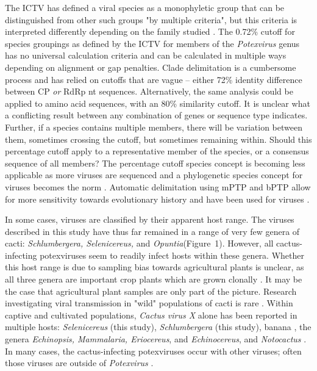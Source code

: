 \documentclass[fleqn,10pt,lineno]{wlpeerj}
\begin{document}
The ICTV has defined a viral species as a monophyletic group that can be distinguished from other such groups "by multiple criteria", but this criteria is interpreted differently depending on the family studied \citep{simmonds2017virus}.
The 0.72\% cutoff for species groupings as defined by the ICTV for members of the \textit{Potexvirus} genus \citep{ICTV_potexviruses} has no universal calculation criteria and can be calculated in multiple ways depending on alignment or gap penalties. 
Clade delimitation is a cumbersome process and has relied on cutoffs that are vague -- either 72\% identity difference between CP \textit{or} RdRp nt sequences.
Alternatively, the same analysis could be applied to amino acid sequences, with an 80\% similarity cutoff. 
It is unclear what a conflicting result between any combination of genes or sequence type indicates. 
Further, if a species contains multiple members, there will be variation between them, sometimes crossing the cutoff, but sometimes remaining within.
Should this percentage cutoff apply to a representative member of the species, or a consensus sequence of all members?
The percentage cutoff species concept is becoming less applicable as more viruses are sequenced and a phylogenetic species concept for viruses becomes the norm \citep{simmonds2018virus}.
Automatic delimitation using mPTP and bPTP allow for more sensitivity towards evolutionary history \citep{Kapli_2017,Zhang_2013} and have been used for viruses \citep{serdari2019automated}. 


In some cases, viruses are classified by their apparent host range.
The viruses described in this study have thus far remained in a range of very few genera of cacti:  \textit{Schlumbergera, Selenicereus,} and \textit{Opuntia}(Figure~1).
However, all cactus-infecting potexviruses seem to readily infect hosts within these genera.
Whether this host range is due to sampling bias towards agricultural plants is unclear, as all three genera are important crop plants which are grown clonally \citep{evallo_brief_2021}.
It may be the case that agricultural plant samples are only part of the picture.
Research investigating viral transmission in "wild" populations of cacti is rare \citep{chessin_distribution_1972}.
Within captive and cultivated populations, \textit{Cactus virus X} alone has been reported in multiple hosts: \textit{Selenicereus} (this study), \textit{Schlumbergera} (this study), banana \citep{bae2022first}, the genera \textit{Echinopsis, Mammalaria, Eriocereus}, and \textit{Echinocereus}\citep{maliarenko_cactus_2013}, and \textit{Notocactus} \citep{park_detection_2018}.
In many cases, the cactus-infecting potexviruses occur with other viruses; often those viruses are outside of \textit{Potexvirus} \citep{evallo_brief_2021, park_detection_2018}.
\end{document}
